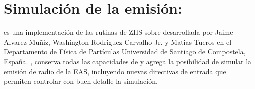 \section{Simulaci\'on de la emisi\'on: \zhs{}}
\label{sc:simRadio}
% 	
% 	

	\zhs{} es una implementaci\'on de las rutinas de ZHS \cite{1_halzen_zas_stanev_1991,2_zas_halzen_stanev_1992} sobre \aires{} desarrollada por Jaime Alvarez-Muñiz, Washington Rodriguez-Carvalho Jr. y Matias Tueros en el Departamento de Física de Partículas Universidad de Santiago de Compostela, España.
	\zhs{}, conserva todas las capacidades de \aires{} y agrega la posibilidad de simular la emisi\'on de radio de la EAS, incluyendo nuevas directivas de entrada que permiten controlar con buen detalle la simulación.
	
